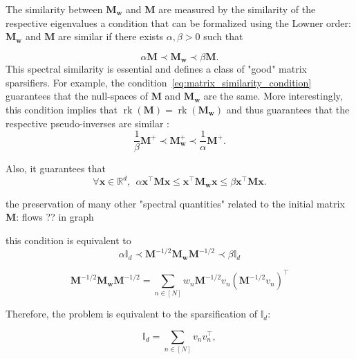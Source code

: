\documentclass[twoside,11pt]{book}
\DeclareMathOperator{\rank}{\mathrm{rk}}
\DeclareMathOperator{\Tran}{\intercal}
\begin{document}
The similarity between $\bm{M}_{\bm{w}}$ and $\bm{M}$ are measured by the similarity of the respective eigenvalues a condition that can be formalized using the Lowner order: $\bm{M}_{\bm{w}}$ and $\bm{M}$  are similar if there exists $\alpha,\beta>0$ such that

\begin{equation}\label{eq:matrix_similarity_condition}
\alpha \bm{M} \prec \bm{M}_{\bm{w}} \prec \beta \bm{M}.
\end{equation}
This spectral similarity is essential and defines a class of "good" matrix sparsifiers. For example, the condition~\eqref{eq:matrix_similarity_condition} guarantees that the null-spaces of $\bm{M}$ and $\bm{M}_{\bm{w}}$ are the same. More interestingly, this condition implies that $\rank(\bm{M}) = \rank(\bm{M}_{\bm{w}})$ and thus guarantees that the respective pseudo-inverses are similar \citep{MiAk77}:
\begin{equation}
\frac{1}{\beta} \bm{M}^{+} \prec \bm{M}_{\bm{w}}^{+} \prec \frac{1}{\alpha} \bm{M}^{+}.
\end{equation}

Also, it guarantees that 
\begin{equation}
\forall \bm{x} \in \mathbb{R}^{d}, \:\:
\alpha \bm{x}^{\Tran}\bm{M}\bm{x} \leq \bm{x}^{\Tran}\bm{M}_{\bm{w}}\bm{x} \leq \beta \bm{x}^{\Tran}\bm{M}\bm{x}.
\end{equation}

the preservation of many other "spectral quantities" related to the initial matrix $\bm{M}$: flows ?? in graph 





this condition is equivalent to
\begin{equation}
\alpha \mathbb{I}_{d} \prec \bm{M}^{-1/2}\bm{M}_{\bm{w}} \bm{M}^{-1/2} \prec \beta \mathbb{I}_{d}
\end{equation}

\begin{equation}
 \bm{M}^{-1/2}\bm{M}_{\bm{w}} \bm{M}^{-1/2}  = \sum\limits_{n \in [N]} w_{n} \bm{M}^{-1/2} v_{n} (\bm{M}^{-1/2} v_{n})^{\Tran}
\end{equation}


Therefore, the problem is equivalent to the sparsification of $\mathbb{I}_{d}$:

\begin{equation}\label{eq:sum_to_identity}
\mathbb{I}_{d} = \sum\limits_{n \in [N]}v_{n}v_{n}^{\Tran},
\end{equation}
\end{document}
